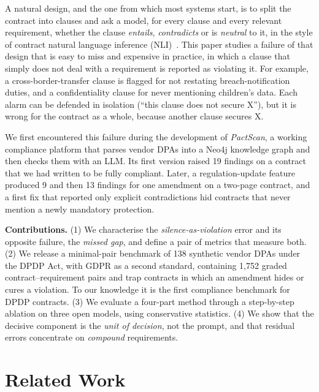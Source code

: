 \documentclass[conference]{IEEEtran}
\begin{document}
A natural design, and the one from which most systems start, is to split the contract into clauses and ask a model, for every clause and every relevant requirement, whether the clause \emph{entails}, \emph{contradicts} or is \emph{neutral} to it, in the style of contract natural language inference (NLI)~\cite{koreeda2021contractnli}. This paper studies a failure of that design that is easy to miss and expensive in practice, in which a clause that simply does not deal with a requirement is reported as violating it. For example, a cross-border-transfer clause is flagged for not restating breach-notification duties, and a confidentiality clause for never mentioning children's data. Each alarm can be defended in isolation (``this clause does not secure X''), but it is wrong for the contract as a whole, because another clause secures X.

We first encountered this failure during the development of \emph{PactScan}, a working compliance platform that parses vendor DPAs into a Neo4j knowledge graph and then checks them with an LLM. Its first version raised 19 findings on a contract that we had written to be fully compliant. Later, a regulation-update feature produced 9 and then 13 findings for one amendment on a two-page contract, and a first fix that reported only explicit contradictions hid contracts that never mention a newly mandatory protection.

\textbf{Contributions.} (1) We characterise the \emph{silence-as-violation} error and its opposite failure, the \emph{missed gap}, and define a pair of metrics that measure both. (2) We release a minimal-pair benchmark of 138 synthetic vendor DPAs under the DPDP Act, with GDPR as a second standard, containing 1,752 graded contract--requirement pairs and trap contracts in which an amendment hides or cures a violation. To our knowledge it is the first compliance benchmark for DPDP contracts. (3) We evaluate a four-part method through a step-by-step ablation on three open models, using conservative statistics. (4) We show that the decisive component is the \emph{unit of decision}, not the prompt, and that residual errors concentrate on \emph{compound} requirements.

\section{Related Work}
\end{document}
